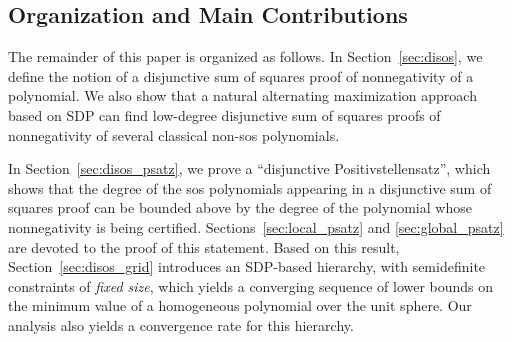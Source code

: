 \documentclass[12pt]{article}
\theoremstyle{remark}
\begin{document}
\subsection{Organization and Main Contributions}
The remainder of this paper is organized as follows. In Section~\ref{sec:disos}, we define the notion of a disjunctive sum of squares proof of nonnegativity of a polynomial. 
We also show that a natural alternating maximization approach based on SDP can find {low-degree disjunctive sum of squares proofs of nonnegativity of several classical non-sos polynomials}.


In Section~\ref{sec:disos_psatz}, we prove a ``disjunctive Positivstellensatz'', which shows that the degree of the sos polynomials appearing in a disjunctive sum of squares proof can be bounded above by the degree of the polynomial whose nonnegativity is being certified. Sections~\ref{sec:local_psatz} and \ref{sec:global_psatz} are devoted to the proof of this statement. Based on this result, Section~\ref{sec:disos_grid} introduces an SDP-based hierarchy, with semidefinite constraints of \emph{fixed size}, which yields 
a converging sequence of 
lower bounds on the minimum value of a homogeneous polynomial over the unit sphere. Our analysis also yields a convergence rate for this hierarchy. 












\end{document}
